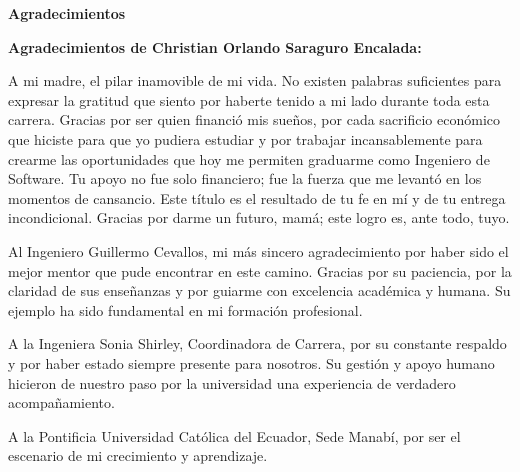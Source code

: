 \clearpage
    \thispagestyle{plain}
    \begin{center}
        \vspace*{2cm}
        \textbf{Agradecimientos}
        
        \vspace{0.8cm}
        \raggedright
        \textbf{Agradecimientos de Christian Orlando Saraguro Encalada:}

        A mi madre, el pilar inamovible de mi vida. No existen palabras suficientes para expresar la gratitud que siento por haberte tenido a mi lado durante toda esta carrera. Gracias por ser quien financió mis sueños, por cada sacrificio económico que hiciste para que yo pudiera estudiar y por trabajar incansablemente para crearme las oportunidades que hoy me permiten graduarme como Ingeniero de Software. Tu apoyo no fue solo financiero; fue la fuerza que me levantó en los momentos de cansancio. Este título es el resultado de tu fe en mí y de tu entrega incondicional. Gracias por darme un futuro, mamá; este logro es, ante todo, tuyo.

        Al Ingeniero Guillermo Cevallos, mi más sincero agradecimiento por haber sido el mejor mentor que pude encontrar en este camino. Gracias por su paciencia, por la claridad de sus enseñanzas y por guiarme con excelencia académica y humana. Su ejemplo ha sido fundamental en mi formación profesional.

        A la Ingeniera Sonia Shirley, Coordinadora de Carrera, por su constante respaldo y por haber estado siempre presente para nosotros. Su gestión y apoyo humano hicieron de nuestro paso por la universidad una experiencia de verdadero acompañamiento.

        A la Pontificia Universidad Católica del Ecuador, Sede Manabí, por ser el escenario de mi crecimiento y aprendizaje.


        \vspace{0.6cm}
    \end{center}
\clearpage
